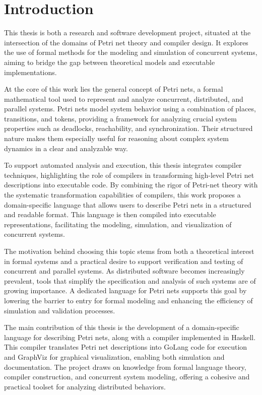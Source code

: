\documentclass[12pt]{article}
\begin{document}
\section{Introduction}
This thesis is both a research and software development project, situated at the intersection of the domains of Petri net theory and compiler design. It explores the use of formal methods for the modeling and simulation of concurrent systems, aiming to bridge the gap between theoretical models and executable implementations.

At the core of this work lies the general concept of Petri nets, a formal mathematical tool used to represent and analyze concurrent, distributed, and parallel systems. Petri nets model system behavior using a combination of places, transitions, and tokens, providing a framework for analyzing crucial system properties such as deadlocks, reachability, and synchronization. Their structured nature makes them especially useful for reasoning about complex system dynamics in a clear and analyzable way.

To support automated analysis and execution, this thesis integrates compiler techniques, highlighting the role of compilers in transforming high-level Petri net descriptions into executable code. By combining the rigor of Petri-net theory with the systematic transformation capabilities of compilers, this work proposes a domain-specific language that allows users to describe Petri nets in a structured and readable format. This language is then compiled into executable representations, facilitating the modeling, simulation, and visualization of concurrent systems.

The motivation behind choosing this topic stems from both a theoretical interest in formal systems and a practical desire to support verification and testing of concurrent and parallel systems. As distributed software becomes increasingly prevalent, tools that simplify the specification and analysis of such systems are of growing importance. A dedicated language for Petri nets supports this goal by lowering the barrier to entry for formal modeling and enhancing the efficiency of simulation and validation processes.

The main contribution of this thesis is the development of a domain-specific language for describing Petri nets, along with a compiler implemented in Haskell. This compiler translates Petri net descriptions into GoLang code for execution and GraphViz for graphical visualization, enabling both simulation and documentation. The project draws on knowledge from formal language theory, compiler construction, and concurrent system modeling, offering a cohesive and practical toolset for analyzing distributed behaviors.
\end{document}
